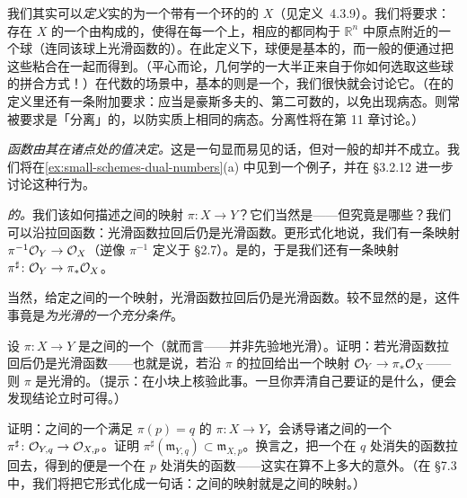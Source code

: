 我们其实可以\emph{定义}实的\trDifferentiable\trManifold{}为一个带有一个环的\trSheaf{}的\trTopologicalSpace{} $X$（见定义~4.3.9）。我们将要求：存在 $X$ 的一个由\trOpenSet{}构成的\trCover，使得在每一个\trOpenSet{}上，相应的\trRingedSpace{}都同构于 $\mathbb{R}^n$ 中原点附近的一个球（连同该球上光滑函数的\trSheaf{}）。在此定义下，球便是基本的\trCoordinatePatch，而一般的\trManifold{}便通过把这些\trCoordinatePatch{}粘合在一起而得到。（平心而论，几何学的一大半正来自于你如何选取这些球的拼合方式！）在代数的场景中，基本的\trCoordinatePatch{}则是一个\trAffineScheme，我们很快就会讨论它。（在\trManifold{}的定义里还有一条附加要求：\trTopologicalSpace{}应当是豪斯多夫的、第二可数的，以免出现病态。\trScheme{}则常被要求是「分离」的，以防实质上相同的病态。分离性将在第 11 章讨论。）

\emph{函数由其在诸点处的值决定。}这是一句显而易见的话，但对一般的\trScheme{}却并不成立。我们将在\cref{ex:small-schemes-dual-numbers}(a) 中见到一个例子，并在 \S3.2.12 进一步讨论这种行为。

\emph{\trManifold{}的\trMorphism。}我们该如何描述\trDifferentiable\trManifold{}之间的映射 $\pi\colon X\to Y$？它们当然是\trContinuousMap——但究竟是哪些？我们可以沿\trContinuousMap{}拉回函数：光滑函数拉回后仍是光滑函数。更形式化地说，我们有一条映射 $\pi^{-1}\mathcal{O}_Y\to\mathcal{O}_X$（逆像\trSheaf{} $\pi^{-1}$ 定义于 \S2.7）。\trInverseImage{}是\trPushforward{}的\trLeftAdjoint，于是我们还有一条映射 $\pi^{\sharp}\colon\mathcal{O}_Y\to\pi_*\mathcal{O}_X$。

当然，给定\trDifferentiable\trManifold{}之间的一个映射，光滑函数拉回后仍是光滑函数。较不显然的是，这件事竟是\emph{\trContinuousMap{}为光滑的一个充分条件}。

\begin{exercise}\label{ex:pullback-detects-smoothness}
设 $\pi\colon X\to Y$ 是\trDifferentiable\trManifold{}之间的一个\trContinuousMap{}（就\trTopologicalSpace{}而言——并非先验地光滑）。证明：若光滑函数拉回后仍是光滑函数——也就是说，若沿 $\pi$ 的拉回给出一个映射 $\mathcal{O}_Y\to\pi_*\mathcal{O}_X$——则 $\pi$ 是光滑的。（提示：在小块\trCoordinatePatch{}上核验此事。一旦你弄清自己要证的是什么，便会发现结论立时可得。）
\end{exercise}

\begin{exercise}\label{ex:stalk-map-preserves-vanishing}
证明：\trDifferentiable\trManifold{}之间的一个满足 $\pi(p)=q$ 的\trMorphism{} $\pi\colon X\to Y$，会诱导诸\trStalk{}之间的一个\trMorphism{} $\pi^{\sharp}\colon\mathcal{O}_{Y,q}\to\mathcal{O}_{X,p}$。证明 $\pi^{\sharp}(\mathfrak{m}_{Y,q})\subset\mathfrak{m}_{X,p}$。换言之，把一个在 $q$ 处消失的函数拉回去，得到的便是一个在 $p$ 处消失的函数——这实在算不上多大的意外。（在 \S7.3 中，我们将把它形式化成一句话：\trManifold{}之间的映射就是\trLocallyRingedSpace{}之间的映射。）
\end{exercise}

